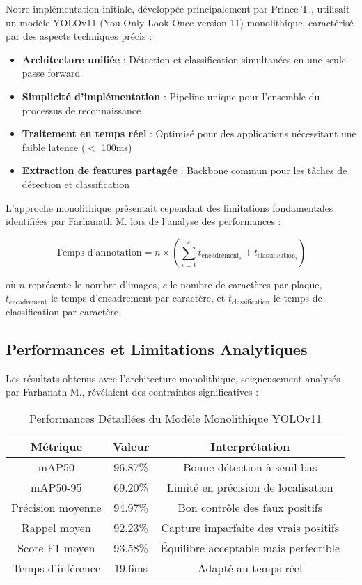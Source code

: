 \documentclass[letterpaper, 10 pt, conference]{ieeeconf}
\begin{document}
Notre implémentation initiale, développée principalement par Prince T., utilisait un modèle YOLOv11 (You Only Look Once version 11) monolithique, caractérisé par des aspects techniques précis :

\begin{itemize}
\item \textbf{Architecture unifiée} : Détection et classification simultanées en une seule passe forward
\item \textbf{Simplicité d'implémentation} : Pipeline unique pour l'ensemble du processus de reconnaissance
\item \textbf{Traitement en temps réel} : Optimisé pour des applications nécessitant une faible latence ($<$ 100ms)
\item \textbf{Extraction de features partagée} : Backbone commun pour les tâches de détection et classification
\end{itemize}

L'approche monolithique présentait cependant des limitations fondamentales identifiées par Farhanath M. lors de l'analyse des performances :

\begin{equation}
\text{Temps d'annotation} = n \times \left( \sum_{i=1}^{c} t_{\text{encadrement}_i} + t_{\text{classification}_i} \right)
\end{equation}

où $n$ représente le nombre d'images, $c$ le nombre de caractères par plaque, $t_{\text{encadrement}}$ le temps d'encadrement par caractère, et $t_{\text{classification}}$ le temps de classification par caractère.

\subsection{Performances et Limitations Analytiques}

Les résultats obtenus avec l'architecture monolithique, soigneusement analysés par Farhanath M., révélaient des contraintes significatives :

\begin{table}[h]
\caption{Performances Détaillées du Modèle Monolithique YOLOv11}
\label{table_monolithique}
\begin{center}
\begin{tabular}{|c|c|c|}
\hline
\textbf{Métrique} & \textbf{Valeur} & \textbf{Interprétation} \\
\hline
mAP50 & 96.87\% & Bonne détection à seuil bas \\
\hline
mAP50-95 & 69.20\% & Limité en précision de localisation \\
\hline
Précision moyenne & 94.97\% & Bon contrôle des faux positifs \\
\hline
Rappel moyen & 92.23\% & Capture imparfaite des vrais positifs \\
\hline
Score F1 moyen & 93.58\% & Équilibre acceptable mais perfectible \\
\hline
Temps d'inférence & 19.6ms & Adapté au temps réel \\
\hline
\end{tabular}
\end{center}
\end{table}
\end{document}
